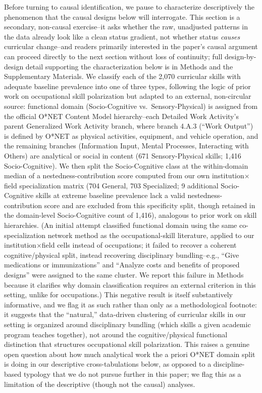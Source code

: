 \documentclass[11pt, letterpaper]{article}
\begin{document}
Before turning to causal identification, we pause to characterize descriptively the phenomenon that the causal designs below will interrogate. This section is a secondary, non-causal exercise--it asks whether the raw, unadjusted patterns in the data already look like a clean status gradient, not whether status \emph{causes} curricular change--and readers primarily interested in the paper's causal argument can proceed directly to the next section without loss of continuity; full design-by-design detail supporting the characterization below is in Methods and the Supplementary Materials. We classify each of the 2,070 curricular skills with adequate baseline prevalence into one of three types, following the logic of prior work on occupational skill polarization but adapted to an external, non-circular source: functional domain (Socio-Cognitive vs.\ Sensory-Physical) is assigned from the official O*NET Content Model hierarchy--each Detailed Work Activity's parent Generalized Work Activity branch, where branch 4.A.3 (``Work Output'') is defined by O*NET as physical activities, equipment, and vehicle operation, and the remaining branches (Information Input, Mental Processes, Interacting with Others) are analytical or social in content (671 Sensory-Physical skills; 1,416 Socio-Cognitive). We then split the Socio-Cognitive class at the within-domain median of a nestedness-contribution score computed from our own institution$\times$field specialization matrix (704 General, 703 Specialized; 9 additional Socio-Cognitive skills at extreme baseline prevalence lack a valid nestedness-contribution score and are excluded from this specificity split, though retained in the domain-level Socio-Cognitive count of 1,416), analogous to prior work on skill hierarchies. (An initial attempt classified functional domain using the same co-specialization network method as the occupational-skill literature, applied to our institution$\times$field cells instead of occupations; it failed to recover a coherent cognitive/physical split, instead recovering disciplinary bundling--e.g., ``Give medications or immunizations'' and ``Analyze costs and benefits of proposed designs'' were assigned to the same cluster. We report this failure in Methods because it clarifies why domain classification requires an external criterion in this setting, unlike for occupations.) This negative result is itself substantively informative, and we flag it as such rather than only as a methodological footnote: it suggests that the ``natural,'' data-driven clustering of curricular skills in our setting is organized around disciplinary bundling (which skills a given academic program teaches together), not around the cognitive/physical functional distinction that structures occupational skill polarization. This raises a genuine open question about how much analytical work the a priori O*NET domain split is doing in our descriptive cross-tabulations below, as opposed to a discipline-based typology that we do not pursue further in this paper; we flag this as a limitation of the descriptive (though not the causal) analyses.
\end{document}
